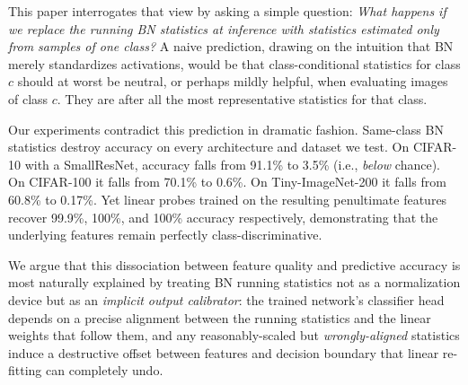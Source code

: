 \documentclass[11pt]{article}
\begin{document}
This paper interrogates that view by asking a simple question: \emph{What happens if we replace the running BN statistics at inference with statistics estimated only from samples of one class?} A naive prediction, drawing on the intuition that BN merely standardizes activations, would be that class-conditional statistics for class $c$ should at worst be neutral, or perhaps mildly helpful, when evaluating images of class $c$. They are after all the most representative statistics for that class.

Our experiments contradict this prediction in dramatic fashion. Same-class BN statistics destroy accuracy on every architecture and dataset we test. On CIFAR-10 with a SmallResNet, accuracy falls from 91.1\% to 3.5\% (i.e., \emph{below} chance). On CIFAR-100 it falls from 70.1\% to 0.6\%. On Tiny-ImageNet-200 it falls from 60.8\% to 0.17\%. Yet linear probes trained on the resulting penultimate features recover 99.9\%, 100\%, and 100\% accuracy respectively, demonstrating that the underlying features remain perfectly class-discriminative.

We argue that this dissociation between feature quality and predictive accuracy is most naturally explained by treating BN running statistics not as a normalization device but as an \emph{implicit output calibrator}: the trained network's classifier head depends on a precise alignment between the running statistics and the linear weights that follow them, and any reasonably-scaled but \emph{wrongly-aligned} statistics induce a destructive offset between features and decision boundary that linear re-fitting can completely undo.
\end{document}
